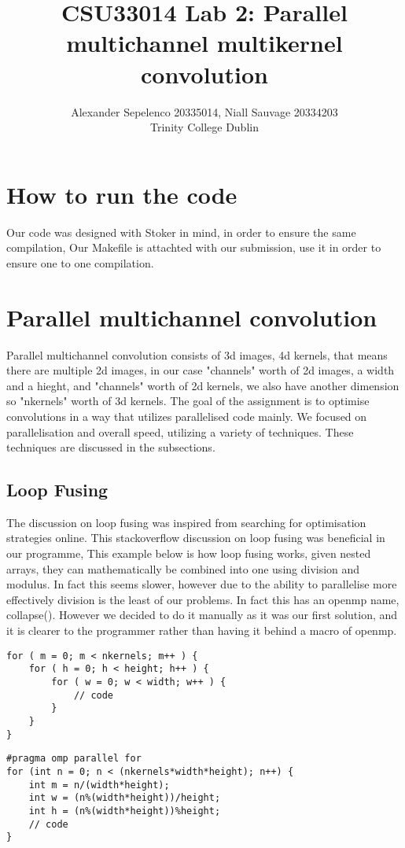\documentclass[12pt,fleqn,leqno,letterpaper]{article}
\title{CSU33014 Lab 2: Parallel multichannel multikernel convolution}
\author{Alexander Sepelenco 20335014, Niall Sauvage 20334203\\
  \small{Trinity College Dublin}
}
\begin{document}
\maketitle
\tableofcontents

\newpage    
\section{How to run the code}
Our code was designed with Stoker in mind, in order to ensure the
same compilation, Our Makefile is attachted with our submission, 
use it in order to ensure one to one compilation.

\section{Parallel multichannel convolution}
Parallel multichannel convolution consists of 3d images, 4d kernels, that means there
are multiple 2d images, in our case "channels" worth of 2d images, a width and a hieght, 
and "channels" worth of 2d kernels, we also have another dimension so "nkernels" worth of 3d kernels. 
The goal of the assignment is to optimise convolutions in a way that utilizes parallelised code mainly.
We focused on parallelisation and overall speed, utilizing a variety of techniques.
These techniques are discussed in the subsections.

\subsection{Loop Fusing}
The discussion on loop fusing was inspired from searching for optimisation strategies online.
This stackoverflow discussion on loop fusing was beneficial in our programme, 
This example below is how loop fusing works, given nested arrays, they can mathematically be combined into 
one using division and modulus. In fact this seems slower, however due to the ability to parallelise more
effectively division is the least of our problems. In fact this has an openmp name, collapse(). However 
we decided to do it manually as it was our first solution, and it is clearer to the programmer rather than
having it behind a macro of openmp.
\begin{verbatim}
for ( m = 0; m < nkernels; m++ ) {
    for ( h = 0; h < height; h++ ) {
        for ( w = 0; w < width; w++ ) {
            // code
        }
    }
}
\end{verbatim}

\begin{verbatim}
#pragma omp parallel for
for (int n = 0; n < (nkernels*width*height); n++) {
    int m = n/(width*height);
    int w = (n%(width*height))/height;
    int h = (n%(width*height))%height;
    // code
}
\end{verbatim}
\end{document}
